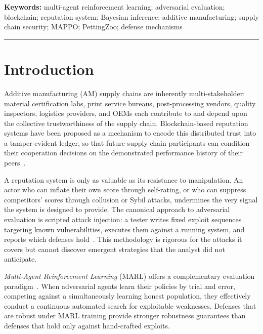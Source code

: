 \vspace{4pt}
{\small\textbf{Keywords:} multi-agent reinforcement learning; adversarial
evaluation; blockchain; reputation system; Bayesian inference; additive
manufacturing; supply chain security; MAPPO; PettingZoo; defense mechanisms}
\vspace{10pt}
\hrule

\section{Introduction}
\label{sec:intro}

Additive manufacturing (AM) supply chains are inherently multi-stakeholder:
material certification labs, print service bureaus, post-processing vendors,
quality inspectors, logistics providers, and OEMs each contribute to and
depend upon the collective trustworthiness of the supply chain.
Blockchain-based reputation systems have been proposed as a mechanism to
encode this distributed trust into a tamper-evident ledger, so that future
supply chain participants can condition their cooperation decisions on the
demonstrated performance history of their peers~\cite{almaayn2024unified,
nakamoto2008bitcoin, androulaki2018hyperledger}.

A reputation system is only as valuable as its resistance to manipulation.
An actor who can inflate their own score through self-rating, or who can
suppress competitors' scores through collusion or Sybil attacks, undermines
the very signal the system is designed to provide.  The canonical approach
to adversarial evaluation is scripted attack injection: a tester writes
fixed exploit sequences targeting known vulnerabilities, executes them
against a running system, and reports which defenses hold~\cite{ferretti2021blockchain,
douceur2002sybil}.  This methodology is rigorous for the attacks it covers
but cannot discover emergent strategies that the analyst did not anticipate.

\emph{Multi-Agent Reinforcement Learning} (MARL) offers a complementary
evaluation paradigm~\cite{lowe2017multi, foerster2018counterfactual,
yu2021surprising}.  When adversarial agents learn their policies by trial
and error, competing against a simultaneously learning honest population,
they effectively conduct a continuous automated search for exploitable
weaknesses.  Defenses that are robust under MARL training provide stronger
robustness guarantees than defenses that hold only against hand-crafted
exploits.

